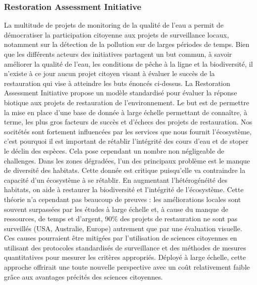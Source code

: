 \documentclass[10pt, article]{llncs}
\begin{document}
		\subsubsection{Restoration Assessment Initiative}
			La multitude de projets de monitoring de la qualité de l'eau a permit de démocratiser la participation citoyenne aux projets de surveillance locaux, notamment sur la détection de la pollution sur de larges périodes de temps. Bien que les différents acteurs des initiatives partagent un but commun, à savoir améliorer la qualité de l'eau, les conditions de pêche à la ligne et la biodiversité, il n'existe à ce jour aucun projet citoyen visant à évaluer le succès de la restauration qui vise à atteindre les buts énoncés ci-dessus. La Restoration Assessment Initiative propose un modèle standardisé pour évaluer la réponse biotique aux projets de restauration de l'environnement. Le but est de permettre la mise en place d'une base de donnée à large échelle permettant de connaître, à terme, les plus gros facteurs de succès et d'échecs des projets de restauration. Nos socitétés sont fortement influencées par les services que nous fournit l'écosystème, c'est pourquoi il est important de rétablir l'intégrité des cours d'eau et de stoper le déclin des espèces. Cela pose cependant un nombre non négligeable de challenges.
			Dans les zones dégradées, l'un des principaux problème est le manque de diversité des habitats. Cette donnée est critique puisqu'elle va contraindre la capacité d'un écosystème à se rétablir. En augmentant l'hétérogénéité des habitats, on aide à restaurer la biodiversité et l'intégrité de l'écosystème. Cette théorie n'a cependant pas beaucoup de preuves : les améliorations locales sont souvent surpassées par les études à large échelle et, à cause du manque de ressources, de temps et d'argent, 90\% des projets de restauration ne sont pas surveillés (USA, Australie, Europe) autrement que par une évaluation visuelle. Ces causes pourraient être mitigées par l'utilisation de sciences citoyennes en utilisant des protocoles standardisés de surveillance et des méthodes de mesures quantitatives pour mesurer les critères appropriés. Déployé à large échelle, cette approche offrirait une toute nouvelle perspective avec un coût relativement faible grâce aux avantages précités des sciences citoyennes.\\
\end{document}
